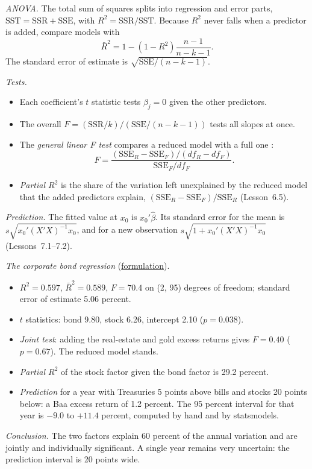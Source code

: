 \begin{qfmethod}\label{meth:multiple-regression-fit-tests}
 \emph{ANOVA.} The total sum of squares splits into regression and error parts, $\mathrm{SST}=\mathrm{SSR}+\mathrm{SSE}$, with $R^2=\mathrm{SSR}/\mathrm{SST}$. Because $R^2$ never falls when a predictor is added, compare models with
\[ \bar R^2=1-(1-R^2)\frac{n-1}{n-k-1}. \]
The standard error of estimate is $\sqrt{\mathrm{SSE}/(n-k-1)}$.

\emph{Tests.}
\begin{itemize}
\item Each coefficient's $t$ statistic tests $\beta_j=0$ given the other predictors.
\item The overall $F=(\mathrm{SSR}/k)/(\mathrm{SSE}/(n-k-1))$ tests all slopes at once.
\item The \emph{general linear F test} compares a reduced model with a full one \citep[Lesson~6.2]{regression-methods-course-notes}:
\[ F=\frac{(\mathrm{SSE}_R-\mathrm{SSE}_F)/(df_R-df_F)}{\mathrm{SSE}_F/df_F}. \]
\item \emph{Partial $R^2$} is the share of the variation left unexplained by the reduced model that the added predictors explain, $(\mathrm{SSE}_R-\mathrm{SSE}_F)/\mathrm{SSE}_R$ (Lesson~6.5).
\end{itemize}

\emph{Prediction.} The fitted value at $x_0$ is $x_0'\hat\beta$. Its standard error for the mean is $s\sqrt{x_0'(X'X)^{-1}x_0}$, and for a new observation $s\sqrt{1+x_0'(X'X)^{-1}x_0}$ (Lessons~7.1--7.2).

 \emph{The corporate bond regression} (\hyperref[meth:multiple-regression-formulation]{formulation}).
\begin{itemize}
\item $R^2=0.597$, $\bar R^2=0.589$, $F=70.4$ on (2, 95) degrees of freedom; standard error of estimate 5.06 percent.
\item $t$ statistics: bond 9.80, stock 6.26, intercept 2.10 ($p=0.038$).
\item \emph{Joint test}: adding the real-estate and gold excess returns gives $F=0.40$ ($p=0.67$). The reduced model stands.
\item \emph{Partial $R^2$} of the stock factor given the bond factor is 29.2 percent.
\item \emph{Prediction} for a year with Treasuries 5 points above bills and stocks 20 points below: a Baa excess return of 1.2 percent. The 95 percent interval for that year is $-9.0$ to $+11.4$ percent, computed by hand and by statsmodels.
\end{itemize}
\emph{Conclusion.} The two factors explain 60 percent of the annual variation and are jointly and individually significant. A single year remains very uncertain: the prediction interval is 20 points wide.


\end{qfmethod}
